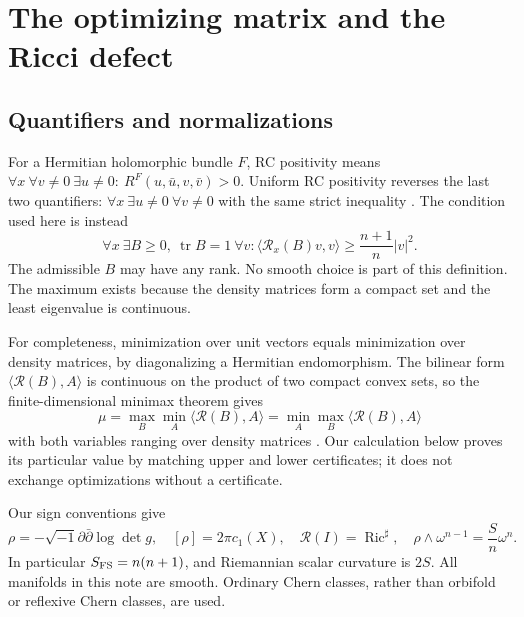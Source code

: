 \documentclass[12pt]{amsart}
\theoremstyle{definition}
\theoremstyle{remark}
\numberwithin{equation}{section}
\DeclareMathOperator{\Ric}{Ric}
\DeclareMathOperator{\tr}{tr}
\theoremstyle{plain}
\theoremstyle{remark}
\theoremstyle{definition}
\begin{document}
\section{The optimizing matrix and the Ricci defect}\label{en:algebra}

\subsection{Quantifiers and normalizations}
For a Hermitian holomorphic bundle $F$, RC positivity means
$\forall x\ \forall v\ne0\ \exists u\ne0:\ R^F(u,\bar u,v,\bar v)>0$.
Uniform RC positivity reverses the last two quantifiers:
$\forall x\ \exists u\ne0\ \forall v\ne0$ with the same strict inequality
\cite[Definition 1.1]{en:Yang}. The condition used here is instead
\[
 \forall x\ \exists B\geq0,\ \tr B=1\ \forall v:
 \langle\mathscr R_x(B)v,v\rangle\geq\frac{n+1}{n}|v|^2.
\]
The admissible $B$ may have any rank. No smooth choice is part of this
definition. The maximum exists because the density matrices form a
compact set and the least eigenvalue is continuous.

For completeness, minimization over unit vectors equals minimization
over density matrices, by diagonalizing a Hermitian endomorphism. The
bilinear form $\langle\mathscr R(B),A\rangle$ is continuous on the product
of two compact convex sets, so the finite-dimensional minimax theorem
gives
\[
 \mu=\max_B\min_A\langle\mathscr R(B),A\rangle
     =\min_A\max_B\langle\mathscr R(B),A\rangle
\]
with both variables ranging over density matrices
\cite[Remark 2.1]{en:DS}. Our calculation below proves its particular
value by matching upper and lower certificates; it does not exchange
optimizations without a certificate.

Our sign conventions give
\[
 \rho=-\sqrt{-1}\partial\bar\partial\log\det g,
 \quad [\rho]=2\pi c_1(X),\quad \mathscr R(I)=\Ric^\sharp,
 \quad \rho\wedge\omega^{n-1}=\frac Sn\omega^n.
\]
In particular $S_{\rm FS}=n(n+1)$, and Riemannian scalar curvature is
$2S$. All manifolds in this note are smooth. Ordinary Chern classes,
rather than orbifold or reflexive Chern classes, are used.
\end{document}
